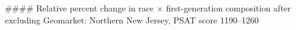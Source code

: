 #### Relative percent change in race × first-generation composition after excluding Geomarket: Northern New Jersey, PSAT score 1190–1260
